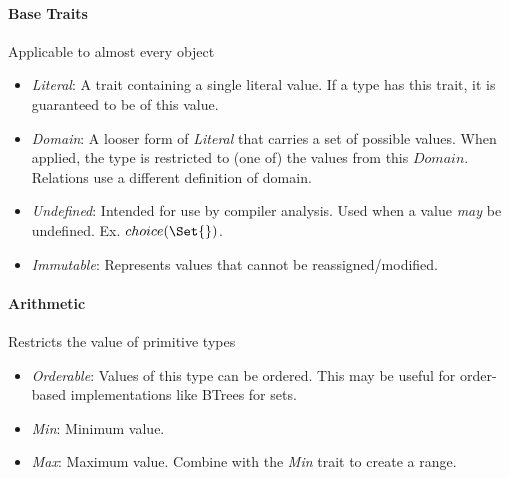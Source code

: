 \paragraph{Base Traits} Applicable to almost every object
\begin{itemize}
    \item \textit{Literal}: A trait containing a single literal value. If a type has this trait, it is guaranteed to be of this value.
    \item \textit{Domain}: A looser form of \textit{Literal} that carries a set of possible values. When applied, the type is restricted to (one of) the values from this $Domain$. Relations use a different definition of domain.
    \item \textit{Undefined}: Intended for use by compiler analysis. Used when a value \textit{may} be undefined. Ex. $choice(\Set{})$.
    \item \textit{Immutable}: Represents values that cannot be reassigned/modified. %
\end{itemize}

\paragraph{Arithmetic} Restricts the value of primitive types
\begin{itemize}
    \item \textit{Orderable}: Values of this type can be ordered. This may be useful for order-based implementations like BTrees for sets.
    \item \textit{Min}: Minimum value.
    \item \textit{Max}: Maximum value. Combine with the \textit{Min} trait to create a range.
\end{itemize}

